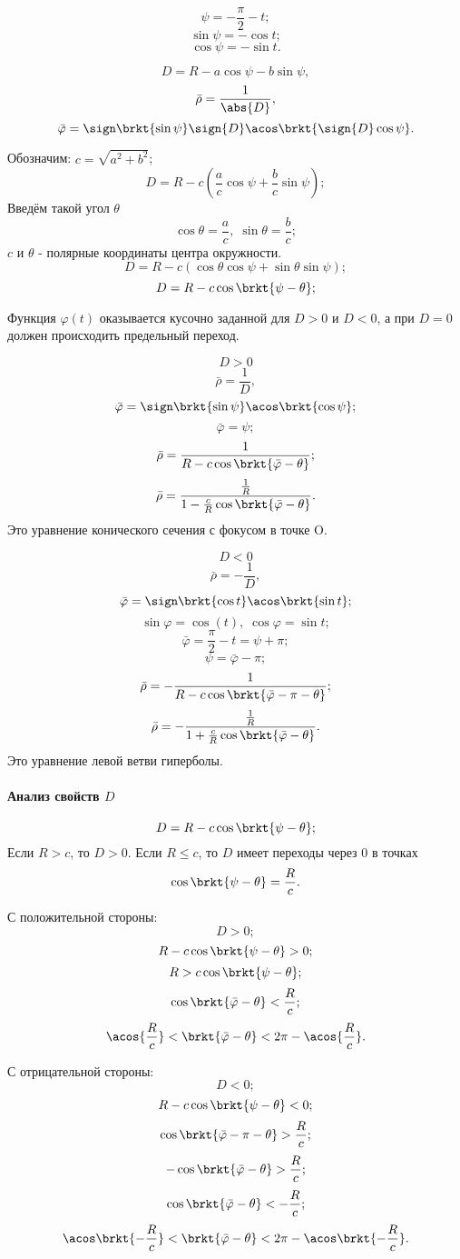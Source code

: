 $$\psi = -\frac{\pi}{2}-t;$$
$$\sin{\psi} = -\cos{t};$$
$$\cos{\psi} = -\sin{t}.$$

$$D = R - a\cos{\psi} - b\sin{\psi},$$
$$\bar{\rho} = \frac{1}{\abs{D}},$$
$$\bar{\varphi} = \sign\brkt{\sin{\psi}}\sign{D}\acos\brkt{\sign{D}\cos{\psi}}.$$

Обозначим: $c = \sqrt{a^2 + b^2}$;
$$D = R - c\left( \frac{a}{c}\cos{\psi} + \frac{b}{c}\sin{\psi} \right);$$
Введём такой угол $\theta$
$$\cos{\theta} = \frac{a}{c},\; \sin{\theta} = \frac{b}{c};$$
$c$ и $\theta$ - полярные координаты центра окружности.
$$D = R - c\left( \cos{\theta}\cos{\psi} + \sin{\theta}\sin{\psi} \right);$$
$$D = R - c\cos\brkt{\psi - \theta};$$

Функция $\varphi(t)$ оказывается кусочно заданной для $D>0$ и $D<0$, а при $D=0$ должен происходить предельный переход.

\begin{minipage}{0.4\textwidth}
$$D>0$$
$$\bar{\rho} = \frac{1}{D},$$
$$\bar{\varphi} = \sign\brkt{\sin{\psi}}\acos\brkt{\cos{\psi}};$$
$$\bar{\varphi} = \psi;$$
$$\bar{\rho} = \frac{1}{R - c\cos\brkt{\bar{\varphi} - \theta}};$$
$$\bar{\rho} = \frac{\frac{1}{R}}{1 - \frac{c}{R}\cos\brkt{\bar{\varphi} - \theta}}.$$
Это уравнение конического сечения с фокусом в точке O.
\end{minipage}
\begin{minipage}{0.4\textwidth}
$$D<0$$
$$\bar{\rho} = -\frac{1}{D},$$
$$\bar{\varphi} = \sign\brkt{\cos{t}}\acos\brkt{\sin{t}};$$
$$\sin{\varphi} = \cos(t),\; \cos{\varphi} = \sin{t};$$
$$\bar{\varphi} = \frac{\pi}{2} - t = \psi + \pi;$$
$$\psi = \bar{\varphi} - \pi;$$
$$\bar{\rho} = -\frac{1}{R - c\cos\brkt{\bar{\varphi} - \pi - \theta}};$$
$$\bar{\rho} = -\frac{\frac{1}{R}}{1 + \frac{c}{R}\cos\brkt{\bar{\varphi}  - \theta}}.$$
Это уравнение левой ветви гиперболы.
\end{minipage}

\paragraph{Анализ свойств $D$}
$$D = R - c\cos\brkt{\psi - \theta};$$
Если $R>c$, то $D>0$. Если $R \le c$, то $D$ имеет переходы через 0 в точках
$$\cos\brkt{\psi - \theta} = \frac{R}{c}.$$
\begin{minipage}{0.4\textwidth}
С положительной стороны:
$$D>0;$$
$$R - c\cos\brkt{\psi - \theta} > 0;$$
$$R > c\cos\brkt{\psi - \theta};$$
$$\cos\brkt{\bar{\varphi} - \theta} < \frac{R}{c};$$
$$\acos{\frac{R}{c}} < \brkt{\bar{\varphi} - \theta} < 2\pi - \acos{\frac{R}{c}}.$$
\end{minipage}
\begin{minipage}{0.4\textwidth}
С отрицательной стороны:
$$D<0;$$
$$R - c\cos\brkt{\psi - \theta} < 0;$$
$$\cos\brkt{\bar{\varphi} - \pi - \theta} > \frac{R}{c};$$
$$-\cos\brkt{\bar{\varphi} - \theta} > \frac{R}{c};$$
$$\cos\brkt{\bar{\varphi} - \theta} < -\frac{R}{c};$$
$$\acos\brkt{-\frac{R}{c}} < \brkt{\bar{\varphi} - \theta} < 2\pi - \acos\brkt{-\frac{R}{c}}.$$
\end{minipage}

